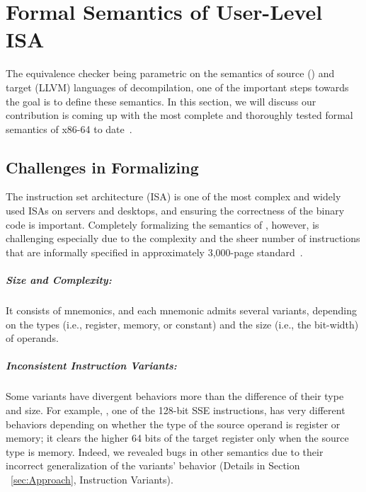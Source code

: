\chapter{Formal Semantics of \ISA User-Level ISA}\label{sec:results}
The equivalence checker being parametric on the semantics of source (\ISA) and target (LLVM) languages of decompilation, one of the important steps towards the goal is to define these semantics. In this section, we will discuss our contribution is coming up with the most complete and thoroughly tested formal
semantics of x86-64 to date~\cite{DasguptaAdve:PLDI19}.


\section{Challenges in Formalizing \ISA}
\label{sec:challenges-in-formalizing-x86}
The \ISA instruction set architecture (ISA) is one of the most complex and widely used ISAs on servers and desktops, and ensuring the correctness of the \ISA binary code is important.
%
Completely formalizing the semantics of \ISA, however, is challenging especially due to the complexity and the sheer number of instructions that are informally specified in approximately 3,000-page standard~\cite{IntelManual}.

\paragraph{Size and Complexity:}
%
It consists of \totalIntel{} mnemonics, and each mnemonic admits several variants, depending on the types (i.e., register, memory, or constant) and the size (i.e., the bit-width) of operands.

\paragraph{Inconsistent Instruction Variants:}
%
Some variants have divergent behaviors more than the difference of their type and size. For example, , one of the 128-bit SSE instructions, has very different behaviors depending on whether the type of the source operand is register or memory; it clears the higher 64 bits of the target register only when the source type is memory.
Indeed, we revealed bugs in other semantics due to their incorrect generalization of the variants' behavior (Details in Section ~\ref{sec:Approach}, Instruction Variants).

